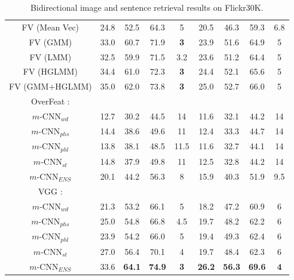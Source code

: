 \documentclass[10pt,twocolumn,letterpaper]{article}
\begin{document}
\begin{table*}
\begin{center}
\begin{tabular}{c|cccc|cccc}
        FV (Mean Vec) \cite{klein_cvpr2015} & 24.8 & 52.5 & 64.3 & 5 & 20.5 & 46.3 & 59.3 & 6.8 \\
        FV (GMM) \cite{klein_cvpr2015} & 33.0 & 60.7 & 71.9 & \textbf{3} & 23.9 & 51.6 & 64.9 & 5 \\
        FV (LMM) \cite{klein_cvpr2015} & 32.5 & 59.9 & 71.5 & 3.2 & 23.6 & 51.2 & 64.4 & 5 \\
        FV (HGLMM) \cite{klein_cvpr2015} & 34.4 & 61.0 & 72.3 & \textbf{3} & 24.4 & 52.1 & 65.6 & 5 \\
        FV (GMM+HGLMM) \cite{klein_cvpr2015} & 35.0 & 62.0 & 73.8 & \textbf{3} & 25.0 & 52.7 & 66.0 & 5 \\

        \hline
        \hline
        OverFeat \cite{sermanet_arxiv2014}:&&&&&&&& \\
        $m$-CNN$_{wd}$ & 12.7 & 30.2 & 44.5 & 14 & 11.6 & 32.1 & 44.2 & 14\\
        $m$-CNN$_{phs}$& 14.4 & 38.6 & 49.6 & 11 & 12.4 & 33.3 & 44.7 & 14\\
        $m$-CNN$_{phl}$& 13.8 & 38.1 & 48.5 & 11.5&11.6 & 32.7 & 44.1 & 14\\
        $m$-CNN$_{st}$ & 14.8 & 37.9 & 49.8 & 11 & 12.5 & 32.8 & 44.2 & 14\\
        $m$-CNN$_{ENS}$ & 20.1 & 44.2 & 56.3 & 8 & 15.9 & 40.3 & 51.9 & 9.5\\
        \hline
        \hline
        VGG \cite{simonyan_arxiv2014}:&&&&&&&& \\
        $m$-CNN$_{wd}$ & 21.3 & 53.2 & 66.1 & 5 & 18.2 & 47.2 & 60.9 & 6\\
        $m$-CNN$_{phs}$& 25.0 & 54.8 & 66.8 & 4.5 & 19.7 & 48.2 & 62.2 & 6\\
        $m$-CNN$_{phl}$& 23.9 & 54.2 & 66.0 & 5 & 19.4 & 49.3 & 62.4 & 6\\
        $m$-CNN$_{st}$ & 27.0 & 56.4 & 70.1 & 4 & 19.7 & 48.4 & 62.3 & 6\\
        $m$-CNN$_{ENS}$ & {33.6} & \textbf{64.1} & \textbf{74.9} & \textbf{3} & \textbf{26.2} & \textbf{56.3} & \textbf{69.6} & \textbf{4}\\
        \hline
        \hline

    \end{tabular}


\end{center}
\caption{Bidirectional image and sentence retrieval results on Flickr30K.}\label{table:flickr30k}
\end{table*}
\end{document}
